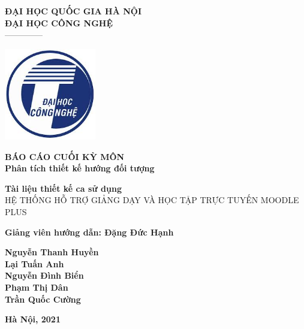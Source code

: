 \documentclass[./main.tex]{subfiles}
\begin{document}
\begin{titlepage}
	\begin{center}
		\textbf{ĐẠI HỌC QUỐC GIA HÀ NỘI}\\
		\textbf{ĐẠI HỌC CÔNG NGHỆ}\\
		--------------

		\vspace*{30pt}

		\includegraphics[width=0.3\textwidth]{./images/uet.jpg}

		\vspace*{50pt}

		\textbf{BÁO CÁO CUỐI KỲ MÔN
			\\ Phân tích thiết kế hướng đối tượng}
		\vspace*{30pt}

		\textbf{Tài liệu thiết kế ca sử dụng\\}
		{\Large HỆ THỐNG HỖ TRỢ GIẢNG DẠY VÀ HỌC TẬP TRỰC TUYẾN MOODLE PLUS}

		\vspace*{50pt}

		\textbf{Giảng viên hướng dẫn: Đặng Đức Hạnh}

		\vspace*{30pt}

		\textbf{Nguyễn Thanh Huyền\\
			Lại Tuấn Anh\\
			Nguyễn Đình Biển\\
			Phạm Thị Dân\\
			Trần Quốc Cường\\
		}

		\vspace*{40pt}
	\end{center}


	\begin{center}
		\textbf{Hà Nội, 2021}
	\end{center}
\end{titlepage}
\end{document}
